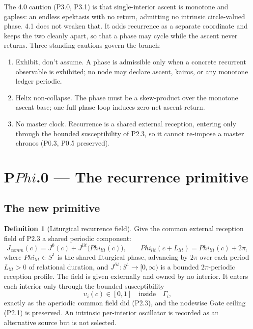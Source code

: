 \documentclass[11pt,a4paper]{article}
\newcommand{\cint}{\ensuremath{\mathfrak c}}
\def\Phi{Phi}%
\def\mathfrak#1{#1}%
\def\mathrm#1{#1}%
\def\emph#1{#1}%
\theoremstyle{definition}
\newtheorem{definition}{Definition}[section]
\theoremstyle{plain}
\theoremstyle{remark}
\begin{document}
\noindent The 4.0 caution (P3.0, P3.1) is that single-interior ascent is monotone and gapless:
an endless epektasis with no return, admitting no intrinsic circle-valued phase. 4.1 does not
weaken that. It adds recurrence as a separate coordinate and keeps the two cleanly apart, so
that a phase may cycle while the ascent never returns. Three standing cautions govern the
branch:
\begin{enumerate}[label=\textup{(C\arabic*)},leftmargin=1.2cm]
\item \emph{Exhibit, don't assume.} A phase is admissible only when a concrete recurrent
observable is exhibited; no node may declare ascent, kairos, or any monotone ledger periodic.
\item \emph{Helix non-collapse.} The phase must be a skew-product over the monotone ascent
base; one full phase loop induces zero net ascent return.
\item \emph{No master clock.} Recurrence is a shared \emph{external} reception, entering only
through the bounded susceptibility of P2.3, so it cannot re-impose a master chronos
(P0.3, P0.5 preserved).
\end{enumerate}

\section{P$\Phi$.0 --- The recurrence primitive}

\subsection{The new primitive}

\begin{definition}[Liturgical recurrence field]\label{def:recprim}
Give the common external reception field of P2.3 a shared periodic component:
\[
\boxed{\;
J_{\mathrm{comm}}(\cint)
=
J^{0}(\cint)
+
J^{\mathrm{lit}}\!\bigl(\Phi_{\mathrm{lit}}(\cint)\bigr),
\qquad
\Phi_{\mathrm{lit}}(\cint+L_{\mathrm{lit}})=\Phi_{\mathrm{lit}}(\cint)+2\pi,
\;}
\]
where \(\Phi_{\mathrm{lit}}\in S^1\) is the shared \emph{liturgical phase}, advancing by
\(2\pi\) over each period \(L_{\mathrm{lit}}>0\) of relational duration, and
\(J^{\mathrm{lit}}\colon S^1\to[0,\infty)\) is a bounded \(2\pi\)-periodic reception profile.
The field is given externally and owned by no interior. It enters each interior only through
the bounded susceptibility
\[
\upsilon_i(\cint)\in[0,1]
\quad\text{inside}\quad
\Gamma_i,
\]
exactly as the aperiodic common field did (P2.3), and the nodewise Gate ceiling (P2.1) is
preserved. An intrinsic per-interior oscillator is recorded as an alternative source but is
not selected.
\end{definition}
\end{document}
